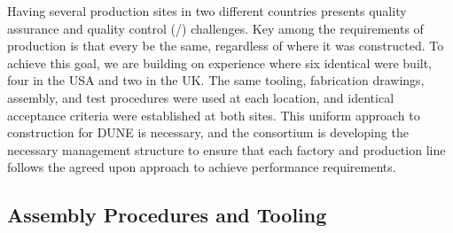 Having several  production sites in two different countries presents quality assurance and quality control (/) challenges. Key among the requirements of production is that every  be the same, regardless of where it was constructed. To achieve this goal, we are building on  experience where six identical  were built, four in the USA and two in the UK. The same tooling, fabrication drawings, assembly, and test procedures were used at each location, and identical acceptance criteria were established at both sites.  This uniform approach to construction for DUNE is necessary, and the  consortium is developing the necessary management structure to ensure that each factory and production line follows the agreed upon approach to achieve  performance requirements.


\subsection{Assembly Procedures and Tooling}
\label{sec:fdsp-apa-prod-tooling}

